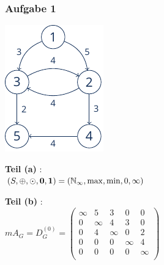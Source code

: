 \documentclass{beamer}
\begin{document}
\begin{frame} \frametitle{Aufgabe 1}
	\begin{minipage}{\dimexpr0.4\linewidth-\fboxrule-\fboxsep}
		\includegraphics[width=\linewidth]{./tut12_task1-graph.pdf}
	\end{minipage}
	\pause
	\begin{minipage}{\dimexpr0.6\linewidth-\fboxrule-\fboxsep}
		\centering
		\textbf{Teil (a)} : \\
		$(S, \oplus, \odot, \mathbf{0}, \mathbf{1}) = (\mathbb{N}_\infty, \max, \min, 0, \infty)$
		
		\hspace{1em} \pause
		
		\textbf{Teil (b)} : \\
		$mA_G = D_G^{(0)} = \begin{pmatrix}
		\infty & 5      & 3      & 0      & 0 \\
		0      & \infty & 4      & 3      & 0 \\
		0      & 4      & \infty & 0      & 2 \\
		0      & 0      & 0      & \infty & 4 \\
		0      & 0      & 0      & 0      & \infty \\
		\end{pmatrix}$	
	\end{minipage}
\end{frame}
\end{document}
